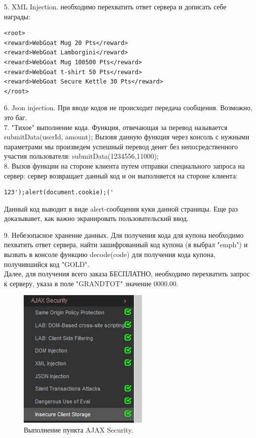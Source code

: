 \documentclass[10pt,a4paper]{article}
\begin{document}
5. XML Injection. необходимо перехватить ответ сервера и дописать себе награды:
\begin{verbatim}
<root>
<reward>WebGoat Mug 20 Pts</reward>
<reward>WebGoat Lamborgini</reward>
<reward>WebGoat Mug 100500 Pts</reward>
<reward>WebGoat t-shirt 50 Pts</reward>
<reward>WebGoat Secure Kettle 30 Pts</reward>
</root>
\end{verbatim}

6. Json injection. При вводе кодов не происходит передача сообщения. Возможно, это баг.\\

7. "Тихое" выполнение кода. Функция, отвечающая за перевод называется submitData(userId, amount); Вызовя данную функция через консоль с нужными параметрами мы произведем успешный перевод денег без непосредственного участия пользователя: submitData(1234556,11000);\\

8. Вызов функции на стороне клиента путем отправки специального запроса на сервер: сервер возвращает данный код и он выполняется на стороне клиента:
\begin{verbatim}
123');alert(document.cookie);('
\end{verbatim}

Данный код выводит в виде alert-сообщения куки данной страницы. Еще раз доказывавет, как важно экранировать пользовательский ввод.

9. Небезопасное хранение данных. Для получения кода для купона необходимо пехватить ответ сервера, найти зашифрованный код купона (я выбрал "emph") и вызвать в консоле функцию decode(code) для получения кода купона, получившийся код "GOLD".\\
Далее, для получения всего заказа БЕСПЛАТНО, необходимо перехватить запрос к серверу, указа в поле "GRANDTOT" значение 0000.00.

\begin{figure}[h!]
\centering
\includegraphics[scale=0.6]{2.jpg}
\caption{Выполнение пункта AJAX Security.}
\end{figure}
\end{document}
